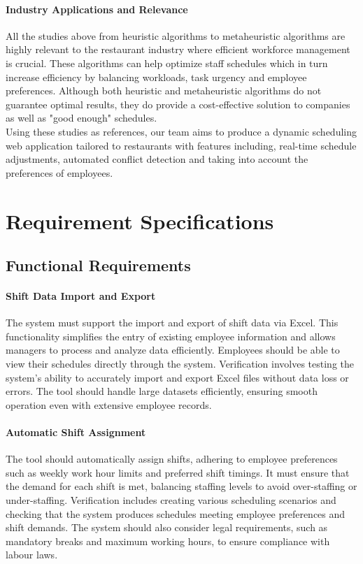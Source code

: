 \documentclass[a4paper,12pt, oneside]{report}
\begin{document}
\subsubsection{Industry Applications and Relevance}
All the studies above from heuristic algorithms to metaheuristic algorithms are highly relevant to the restaurant industry where efficient workforce management is crucial. These algorithms can help optimize staff schedules which in turn increase efficiency by balancing workloads, task urgency and employee preferences. Although both heuristic and metaheuristic algorithms do not guarantee optimal results, they do provide a cost-effective solution to companies as well as "good enough" schedules.\\

Using these studies as references, our team aims to produce a dynamic scheduling web application tailored to restaurants with features including, real-time schedule adjustments, automated conflict detection and taking into account the preferences of employees. 


\chapter{Requirement Specifications}
\section{Functional Requirements}

\subsubsection{Shift Data Import and Export}
The system must support the import and export of shift data via Excel. This functionality simplifies the entry of existing employee information and allows managers to process and analyze data efficiently. Employees should be able to view their schedules directly through the system. Verification involves testing the system’s ability to accurately import and export Excel files without data loss or errors. The tool should handle large datasets efficiently, ensuring smooth operation even with extensive employee records.\\

\subsubsection{Automatic Shift Assignment}
The tool should automatically assign shifts, adhering to employee preferences such as weekly work hour limits and preferred shift timings. It must ensure that the demand for each shift is met, balancing staffing levels to avoid over-staffing or under-staffing. Verification includes creating various scheduling scenarios and checking that the system produces schedules meeting employee preferences and shift demands. The system should also consider legal requirements, such as mandatory breaks and maximum working hours, to ensure compliance with labour laws.\\
\end{document}
